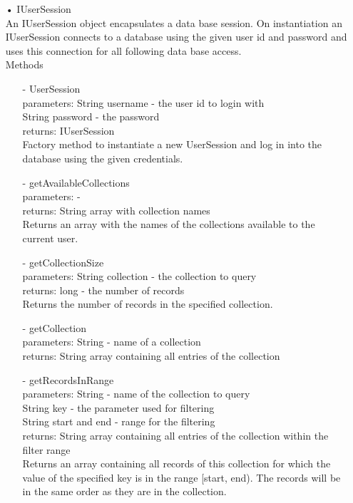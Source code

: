 \documentclass[oneside, english, final]{design}
\begin{document}
\begin{itemize}
	\item[•]IUserSession
	      \\An IUserSession object encapsulates a data base session.
	      On instantiation an IUserSession connects to a database using
	      the given user id and password and uses this connection for
	      all following data base access.
	      \\Methods
	      \begin{itemize}
		      \item[-]UserSession
		            \\parameters: String username - the user id to login with
		            \\String password - the password
		            \\returns: IUserSession
		            \\Factory method to instantiate a new UserSession and log in into the database using the given credentials.

		      \item[-]getAvailableCollections
		            \\parameters: -
		            \\returns: String array with collection names
		            \\Returns an array with the names of the collections available to the current user.

		      \item[-]getCollectionSize
		            \\parameters: String collection - the collection to query
		            \\returns: long - the number of records
		            \\Returns the number of records in the specified collection.

		      \item[-]getCollection
		            \\parameters: String - name of a collection
		            \\returns: String array containing all entries of the collection

		      \item[-]getRecordsInRange
		            \\parameters: String - name of the collection to query
		            \\String key - the parameter used for filtering
		            \\String start and end - range for the filtering
		            \\returns: String array containing all entries of the collection within the filter range
		            \\ Returns an array containing all records of this
		            collection for which the value of the
		            specified key is in the range [start, end).
		            The records will be in the same order as
		            they are in the collection.


\end{itemize}
\end{itemize}
\end{document}
